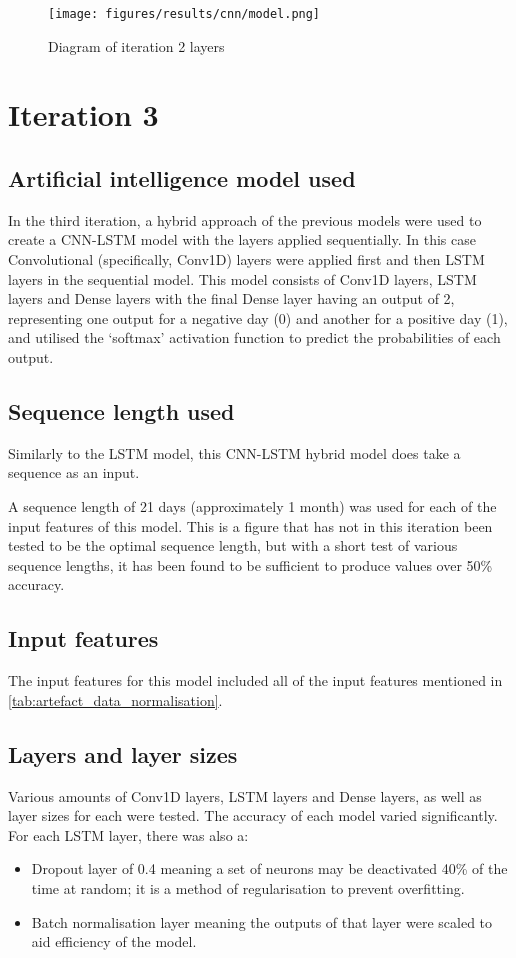 \begin{figure}[ht]
    \centering
    \texttt{[image: figures/results/cnn/model.png]}
    \caption[Diagram of iteration 2 layers]{Diagram of iteration 2 layers}
    \label{fig:iteration2_model}
\end{figure}
\FloatBarrier

\section{Iteration 3}
\subsection{Artificial intelligence model used}\label{ssec:iteration3_ai_model}
In the third iteration, a hybrid approach of the previous models were used to create a CNN-LSTM model with the layers applied sequentially.
In this case Convolutional (specifically, Conv1D) layers were applied first and then LSTM layers in the sequential model.
This model consists of Conv1D layers, LSTM layers and Dense layers with the final Dense layer having an output of 2, representing one output for
a negative day (0) and another for a positive day (1), and utilised the `softmax' activation function to predict the
probabilities of each output.

\subsection{Sequence length used}
Similarly to the LSTM model, this CNN-LSTM hybrid model does take a sequence as an input.

A sequence length of 21 days (approximately 1 month) was used for each of the input features of this model.
This is a figure that has not in this iteration been tested to be the optimal sequence length, but with a short
test of various sequence lengths, it has been found to be sufficient to produce values over 50\% accuracy.

\subsection{Input features}
The input features for this model included all of the input features mentioned in \autoref{tab:artefact_data_normalisation}.

\subsection{Layers and layer sizes} \label{ssec:iteration3layers}
Various amounts of Conv1D layers, LSTM layers and Dense layers, as well as layer sizes for each were tested. The accuracy of each model varied
significantly. For each LSTM layer, there was also a:
\begin{itemize}
    \item Dropout layer of 0.4 meaning a set of neurons may be
    deactivated 40\% of the time at random; it is a method of regularisation to prevent overfitting.
    \item Batch normalisation layer meaning the outputs of that layer were scaled to aid efficiency of the model.
\end{itemize}

